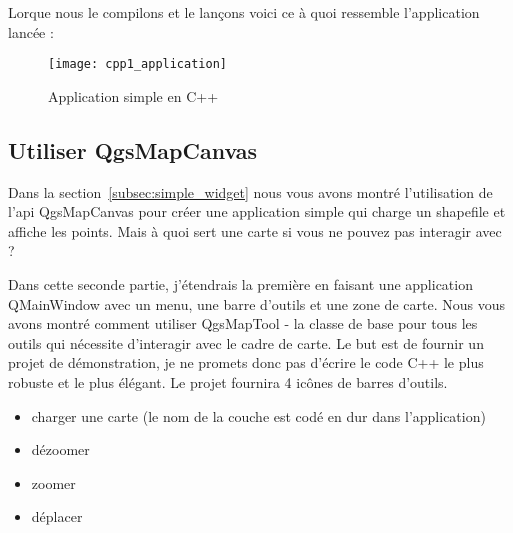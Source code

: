 Lorque nous le compilons et le lançons voici ce à quoi ressemble l'application lancée :
\begin{figure}[ht]
   \begin{center}
   \caption{Application simple en C++ \osxcaption}\label{fig:cpp1_application}\smallskip
   \texttt{[image: cpp1\_application]}
\end{center}
\end{figure}

\subsection{Utiliser QgsMapCanvas}

Dans la section~\ref{subsec:simple_widget} nous vous avons montré l'utilisation 
de l'api QgsMapCanvas pour créer une application simple qui charge un shapefile 
et affiche les points. Mais à quoi sert une carte si vous ne pouvez pas 
interagir avec ?

Dans cette seconde partie, j'étendrais la première en faisant une application 
QMainWindow avec un menu, une barre d'outils et une zone de carte. Nous vous 
avons montré comment utiliser QgsMapTool - la classe de base pour tous les 
outils qui nécessite d'interagir avec le cadre de carte.
Le but est de fournir un projet de démonstration, je ne promets donc pas d'écrire
 le code C++ le plus robuste et le plus élégant. Le projet fournira 4 icônes de 
 barres d'outils.

\begin{itemize}
  \item charger une carte (le nom de la couche est codé en dur dans l'application)
  \item dézoomer
  \item zoomer
  \item déplacer
\end{itemize}

